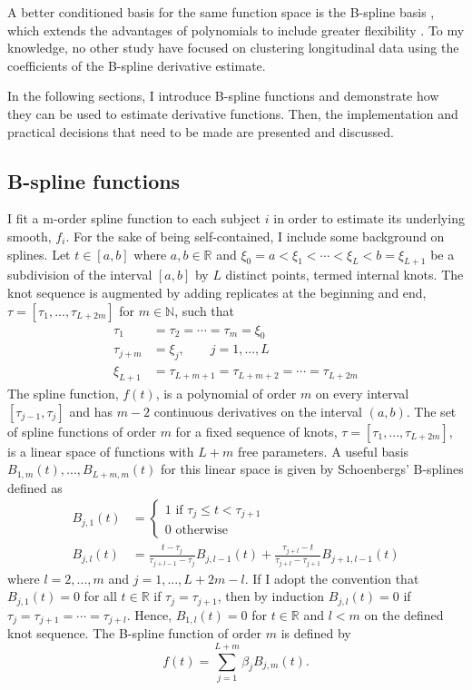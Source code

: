 A better conditioned basis for the same function space is the B-spline basis \cite{deboor1978, schumaker1981,curry1966, de1976}, which extends the advantages of polynomials to include greater flexibility \cite{abraham2003}. To my knowledge, no other study have focused on clustering longitudinal data using the coefficients of the B-spline derivative estimate.

In the following sections, I introduce B-spline functions and demonstrate how they can be used to estimate derivative functions. Then, the implementation and practical decisions that need to be made are presented and discussed.

\subsection{B-spline functions}\label{sec:bsplines}
I fit a m-order spline function to each subject $i$ in order to estimate its underlying smooth, $f_i$. For the sake of being self-contained, I include some background on splines. Let $t\in[a,b]$ where $a,b\in\mathbb{R}$ and $\xi_0=a<\xi_{1}<\cdots<\xi_{L} < b = \xi_{L+1}$ be a subdivision of  the interval $[a,b]$ by $L$ distinct points, termed internal knots. The knot sequence is augmented by adding replicates at the beginning and end, $\tau=[\tau_{1},...,\tau_{L+2m}]$ for $m\in\mathbb{N}$, such that 
\begin{align*}
\tau_{1}&=\tau_{2}=\cdots =\tau_{m} =\xi_{0}\\
\tau_{j+m}& = \xi_{j}, \quad\quad j=1,...,L\\
\xi_{L+1}&=\tau_{L+m+1}=\tau_{L+m+2}=\cdots =\tau_{L+2m} 
\end{align*}
The spline function, $f(t)$, is a polynomial of order $m$ on every interval $[\tau_{j-1},\tau_{j}]$ and has $m-2$ continuous derivatives on the interval $(a,b)$. The set of spline functions of order $m$ for a fixed sequence of knots, $\tau = [\tau_1,...,\tau_{L+2m}]$, is a linear space of functions with $L+m$ free parameters. A useful basis $B_{1,m}(t),...,B_{L+m,m}(t)$ for this linear space is given by Schoenbergs' B-splines \cite{curry1966, de1976} defined as
\begin{align*}
B_{j,1}(t) &= \begin{cases}
1 \text{ if }\tau_j\leq t < \tau_{j+1}\\
0\text{ otherwise}
\end{cases}\\
B_{j,l}(t) &= \frac{t-\tau_j}{\tau_{j+l-1}-\tau_j} B_{j,l-1}(t)+\frac{\tau_{j+l}-t}{\tau_{j+l}-\tau_{j+1}} B_{j+1,l-1}(t)
\end{align*}
where $l=2,...,m$ and $j=1,...,L+2m-l$.  If I adopt the convention that $B_{j,1}(t)=0$ for all $t\in\mathbb{R}$ if $\tau_{j}=\tau_{j+1}$, then by induction $B_{j,l}(t)=0$ if $\tau_{j}=\tau_{j+1}=\cdots=\tau_{j+l}$. Hence, $B_{1,l}(t)=0$ for $t\in\mathbb{R}$ and $l<m$ on the defined knot sequence. The B-spline function of order $m$ is defined by
$$f(t) = \sum^{L+m}_{j=1} \beta_j B_{j,m}(t).$$

